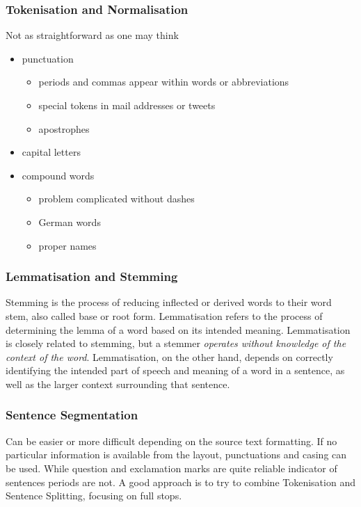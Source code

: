 \documentclass[11pt]{article}
\begin{document}
\subsubsection{Tokenisation and Normalisation}
Not as straightforward as one may think
\begin{itemize}
	\item punctuation
	\begin{itemize}
		\item periods and commas appear within words or abbreviations
		\item special tokens in mail addresses or tweets
		\item apostrophes
	\end{itemize}
	\item capital letters
	\item compound words
	\begin{itemize}
		\item problem complicated without dashes
		\item German words
		\item proper names
	\end{itemize}
\end{itemize}

\subsubsection{Lemmatisation and Stemming}
Stemming is the process of reducing inflected or derived words to their word stem, also called base or root form. Lemmatisation refers to the process of determining the lemma of a word based on its intended meaning. Lemmatisation is closely related to stemming, but a stemmer \emph{operates without knowledge of the context of the word}. Lemmatisation, on the other hand, depends on correctly identifying the intended part of speech and meaning of a word in a sentence, as well as the larger context surrounding that sentence.

\subsubsection{Sentence Segmentation}
Can be easier or more difficult depending on the source text formatting. If no particular information is available from the layout, punctuations and casing can be used. While question and exclamation marks are quite reliable indicator of sentences periods are not. A good approach is to try to combine Tokenisation and Sentence Splitting, focusing on full stops.
\end{document}
